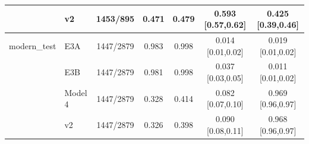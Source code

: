\begin{table}[ht]
{\begin{tabular}{|l|l|c|c|c|c|c|}
 & v2 & 1453/895 & 0.471 & 0.479 & 0.593 [0.57,0.62] & 0.425 [0.39,0.46] \\
\hline
modern\_test & E3A & 1447/2879 & 0.983 & 0.998 & 0.014 [0.01,0.02] & 0.019 [0.01,0.02] \\
 & E3B & 1447/2879 & 0.981 & 0.998 & 0.037 [0.03,0.05] & 0.011 [0.01,0.02] \\
 & Model 4 & 1447/2879 & 0.328 & 0.414 & 0.082 [0.07,0.10] & 0.969 [0.96,0.97] \\
 & v2 & 1447/2879 & 0.326 & 0.398 & 0.090 [0.08,0.11] & 0.968 [0.96,0.97] \\
\hline
\end{tabular}}\end{table}

\begin{table}[ht]\centering\caption[Video-level results on the Celeb-DF held-out identities (91 real and 56 fake videos), clean]{Video-level results on the Celeb-DF held-out identities (91 real and 56 fake videos), clean inputs.}\label{tab:e3-video}\small{}\end{table}

